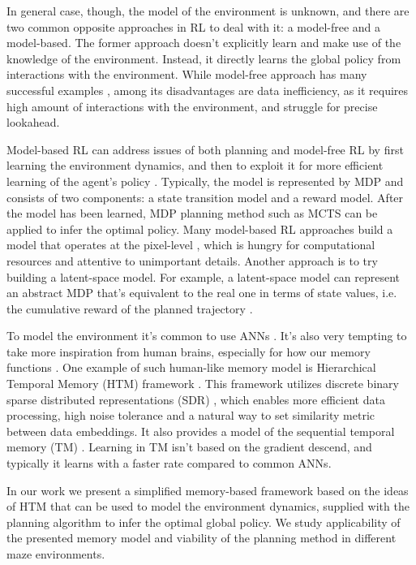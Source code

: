 \documentclass[a4paper,twoside]{article}
\begin{document}
In general case, though, the model of the environment is unknown, and there are two common opposite approaches in RL to deal with it: a model-free and a model-based. The former approach doesn't explicitly learn and make use of the knowledge of the environment. Instead, it directly learns the global policy from interactions with the environment. While model-free approach has many successful examples \cite{Mnih_2015_Atari,haarnoja_2018_sac,schulman_2017_ppo}, among its disadvantages are data inefficiency, as it requires high amount of interactions with the environment, and struggle for precise lookahead.

Model-based RL can address issues of both planning and model-free RL by first learning the environment dynamics, and then to exploit it for more efficient learning of the agent's policy \cite{moerland_2020_modelbased}. Typically, the model is represented by MDP and consists of two components: a state transition model and a reward model. After the model has been learned, MDP planning method such as MCTS \cite{Coulom_2007_mcts} can be applied to infer the optimal policy. Many model-based RL approaches build a model that operates at the pixel-level \cite{kaiser_2020_modelbased}, which is hungry for computational resources and attentive to unimportant details. Another approach is to try building a latent-space model. For example, a latent-space model can represent an abstract MDP that's equivalent to the real one in terms of state values, i.e. the cumulative reward of the planned trajectory \cite{silver_2020_muzero}.

To model the environment it's common to use ANNs \cite{silver_2020_muzero,Ha_Schmidhuber_2018_worldmodels}. It's also very tempting to take more inspiration from human brains, especially for how our memory functions \cite{Hassabis_2017_neuro}. One example of such human-like memory model is Hierarchical Temporal Memory (HTM) framework \cite{George_Hawkins_2009}. This framework utilizes discrete binary sparse distributed representations (SDR) \cite{Cui_Ahmad_Hawkins_2017_sdr}, which enables more efficient data processing, high noise tolerance and a natural way to set similarity metric between data embeddings. It also provides a model of the sequential temporal memory (TM) \cite{hawkins_TM}. Learning in TM isn't based on the gradient descend, and typically it learns with a faster rate compared to common ANNs.

In our work we present a simplified memory-based framework based on the ideas of HTM that can be used to model the environment dynamics, supplied with the planning algorithm to infer the optimal global policy. We study applicability of the presented memory model and viability of the planning method in different maze environments.
\end{document}
